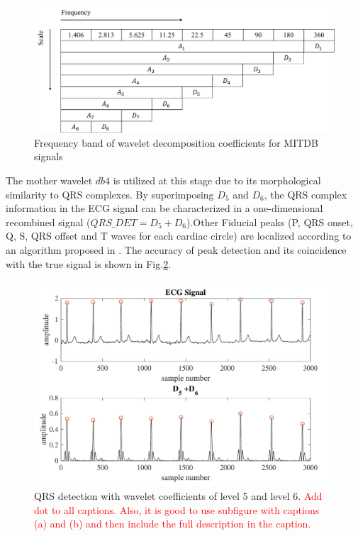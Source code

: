 \begin{figure}[t]
\centering
\includegraphics[scale=.5]{Fig/scale_wavelet.png}
\caption{Frequency band of wavelet decomposition coefficients for MITDB signals}
\label{fig:wavelet_decomp}
\end{figure}


The mother wavelet $db4$ is utilized at this stage due to its morphological similarity to QRS complexes. By superimposing $D_5$ and $D_6$, the QRS complex information in the ECG signal can be characterized in a one-dimensional recombined signal ($QRS\_DET = D_5+D_6$).Other Fiducial peaks (P, QRS onset, Q, S, QRS offset and T waves for each cardiac circle) are localized according to an algorithm proposed in \cite{2012qrs}. The accuracy of peak detection and its coincidence with the true signal is shown in Fig.\ref{fig:QRS_d5d6}.

\begin{figure}[t]
\centering
\includegraphics[scale=.7]{Fig/QRS_D5D6.pdf}
\caption{QRS detection with wavelet coefficients of level 5 and level 6. \textcolor{red}{Add dot to all captions. Also, it is good to use subfigure with captions (a) and (b) and then include the full description in the caption.}}
\label{fig:QRS_d5d6}
\end{figure}


